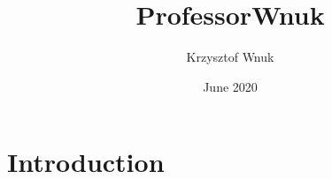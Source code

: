 \documentclass{article}
\title{ProfessorWnuk}
\author{Krzysztof Wnuk}
\date{June 2020}
\begin{document}
\maketitle

\section{Introduction}
\end{document}
